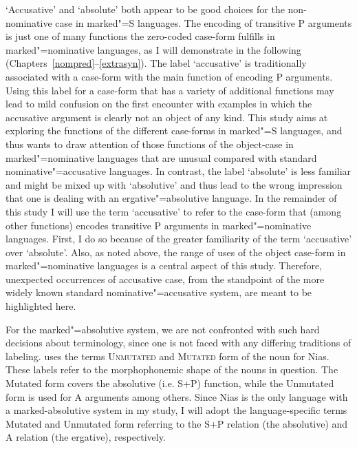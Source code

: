 `Accusative' and `absolute' both appear to be good choices for the non-no\-mi\-na\-tive case in marked"=S languages. 
The encoding of transitive P arguments is just one of many functions the zero-coded case-form fulfills in marked"=nominative languages, as I will demonstrate in the following (Chapters~\ref{nompred}--\ref{extrasyn}). 
The label `accusative' is traditionally associated with a case-form with the main function of encoding P arguments. 
Using this label for a case-form that has a variety of additional functions may lead to mild confusion on the first encounter with examples in which the accusative argument is clearly not an object of any kind. 
This study aims at exploring the functions of the different case-forms in marked"=S languages, and thus wants to draw attention of those functions of the object-case in marked"=nominative languages that are unusual compared with standard nominative"=accusative languages. 
In contrast, the label `absolute' is less familiar and might be mixed up with `absolutive' and thus lead to the wrong impression that one is dealing with an ergative"=absolutive language. 
In the remainder of this study I will use the term `accusative' to refer to the case-form that (among other functions) encodes transitive P arguments in marked"=nominative languages. First, I do so because of the greater familiarity of the term `accusative' over `absolute'. 
Also, as noted above, the range of uses of the object case-form in marked"=nominative languages is a central aspect of this study. 
Therefore, unexpected occurrences of accusative case, from the standpoint of the more widely known standard nominative"=accusative system, are meant to be highlighted here.

For the marked"=absolutive system, we are not confronted with such hard decisions about terminology, since one is not faced with any differing traditions of labeling. 
\citet{Brown:2001} uses the terms \textsc{Unmutated} and \textsc{Mutated} form of the noun for Nias. 
These labels refer to the morphophonemic shape of the nouns in question. 
The Mutated form covers the absolutive (i.e. S+P) function, while the Unmutated form is used for A arguments among others. 
Since Nias is the only language with a marked-absolutive system in my study, I will adopt the language-specific terms Mutated and Unmutated form referring to the S+P relation (the absolutive) and A relation (the ergative), respectively. 

